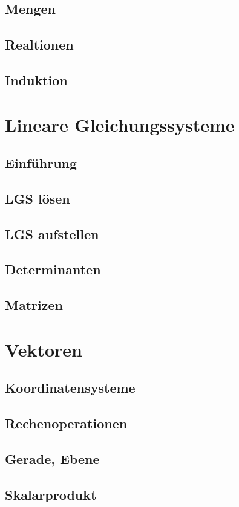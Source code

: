 \documentclass[a4paper,10pt]{scrartcl}
\begin{document}
        \subsection{Mengen}
        \subsection{Realtionen}
        \subsection{Induktion}

    \section{Lineare Gleichungssysteme}
        \subsection{Einführung}
        \subsection{LGS lösen}
        \subsection{LGS aufstellen}
        \subsection{Determinanten}
        \subsection{Matrizen}
    
    \section{Vektoren}
        \subsection{Koordinatensysteme}
        \subsection{Rechenoperationen}
        \subsection{Gerade, Ebene}
        \subsection{Skalarprodukt}
\end{document}
